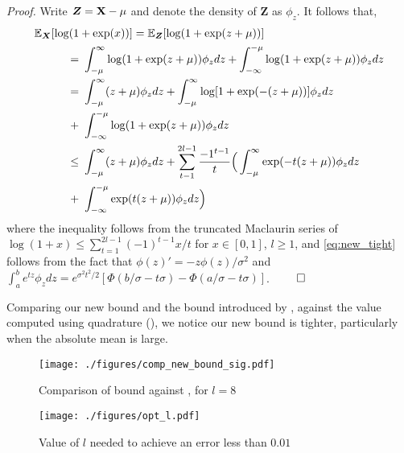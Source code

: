 \textit{Proof.} Write $\boldsymbol{Z} = \mathbf{X} - \mu$ and denote the density of $\boldsymbol{Z}$ as $\phi_z$. It follows that,
{\allowdisplaybreaks %
\begin{align}
    \E_{\boldsymbol{X}} [ \log(1 & + \exp(x)) ] =
    \E_{\boldsymbol{Z}} [ \log(1+ \exp(z + \mu)) ]
    \nonumber
    \\
    =&\ 
	\int_{-\mu}^\infty \log(1 + \exp(z + \mu)) \phi_z dz
	+ \int_{-\infty}^{-\mu} \log(1 + \exp(z + \mu)) \phi_z dz
    \nonumber
    \\
    =&\ 
	\int_{-\mu}^\infty (z + \mu) \phi_z dz
	+ \int_{-\mu}^\infty \log[1 + \exp(-(z+\mu))] \phi_z dz 
    \nonumber \\
    +&\ \int_{-\infty}^{-\mu} \log(1 + \exp(z + \mu))\phi_z dz
    \nonumber
    \\
    \leq &\ 
	\int_{-\mu}^\infty (z + \mu) \phi_z dz
	+ \sum_{t-1}^{2l-1} \frac{-1^{t-1}}{t} \Big(
		\int_{-\mu}^\infty \exp(-t(z+\mu)) \phi_z dz 
    \nonumber
    \\
	+&\ \int_{-\infty}^{-\mu} \exp(t(z + \mu)) \phi_z dz
	\Big)
    \nonumber
\end{align}%
} %
where the inequality follows from the truncated Maclaurin series of $\log(1+x) \leq \sum_{t=1}^{2l-1} (-1)^{t-1}x/t$ for $x \in [0, 1]$, $l\geq 1$, and \eqref{eq:new_tight} follows from the fact that $\phi(z)' = - z\phi(z) / \sigma^2 $ and $ \int_{a}^b e^{tz} \phi_z dz = e^{\sigma^2 t^2 / 2} \left[ \Phi(b/\sigma - t \sigma) - \Phi(a/\sigma - t\sigma) \right]$. $\qed$

Comparing our new bound and the bound introduced by \citep{Jakkola97}, against the value computed using quadrature (), we notice our new bound is tighter, particularly when the absolute mean is large. 
\begin{figure}[htp]
    \centering
    \texttt{[image: ./figures/comp\_new\_bound\_sig.pdf]}
    \caption{Comparison of bound against \citep{Jakkola97}, for $l=8$}
    \label{fig:bound_comp_sig}
\end{figure}

\begin{figure}[htp]
    \centering
    \texttt{[image: ./figures/opt\_l.pdf]}
    \caption{Value of $l$ needed to achieve an error less than $0.01$}
    \label{fig:opt_l}
\end{figure}

